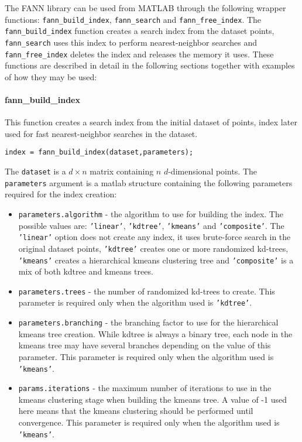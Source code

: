 \documentclass[letter,10pt]{article}
\begin{document}
The FANN library can be used from MATLAB through the following wrapper functions: \texttt{fann\_build\_index}, \texttt{fann\_search} and \texttt{fann\_free\_index}. The \texttt{fann\_build\_index} function creates a search index from the dataset points, \texttt{fann\_search} uses this index to perform nearest-neighbor searches and \texttt{fann\_free\_index} deletes the index and releases the memory it uses. These functions are described in detail in the following sections together with examples of how they may be used:


\paragraph{fann\_build\_index} 

This function creates a search index from the initial dataset of points, index later used for fast nearest-neighbor searches in the dataset.
\begin{Verbatim}
index = fann_build_index(dataset,parameters);
\end{Verbatim}

The \texttt{dataset} is a $d \times n$ matrix containing $n$ $d$-dimensional points. The \texttt{parameters} argument is a matlab structure containing the following parameters required for the index creation:
\begin{itemize}
	\item \texttt{parameters.algorithm} - the algorithm to use for building the index. The possible values are: \texttt{'linear'}, \texttt{'kdtree'}, \texttt{'kmeans'} and \texttt{'composite'}. The \texttt{'linear'} option does not create any index, it uses brute-force search in the original dataset points, \texttt{'kdtree'} creates one or more randomized kd-trees, \texttt{'kmeans'} creates a hierarchical kmeans clustering tree and \texttt{'composite'} is a mix of both kdtree and kmeans trees.
	
	\item \texttt{parameters.trees} - the number of randomized kd-trees to create. This parameter is required only when the algorithm used is \texttt{'kdtree'}.
	
	\item \texttt{parameters.branching} - the branching factor to use for the hierarchical kmeans tree creation. While kdtree is always a binary tree, each node in the kmeans tree may have several branches depending on the value of this parameter. This parameter is required only when the algorithm used is \texttt{'kmeans'}.
	
	\item \texttt{params.iterations} - the maximum number of iterations to use in the kmeans clustering stage when building the kmeans tree. A value of -1 used here means that the kmeans clustering should be performed until convergence. This parameter is required only when the algorithm used is \texttt{'kmeans'}.
\end{itemize}
\end{document}
